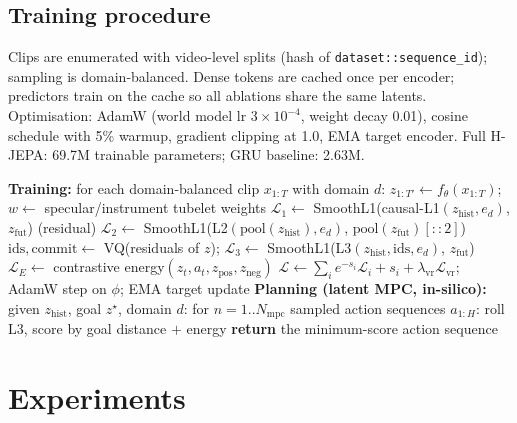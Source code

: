 \documentclass[final,3p,times,twocolumn]{elsarticle}
\begin{document}
\subsection{Training procedure}
Clips are enumerated with video-level splits (hash of \texttt{dataset::sequence\_id}); sampling is domain-balanced. Dense tokens are cached once per encoder; predictors train on the cache so all ablations share the same latents. Optimisation: AdamW (world model lr $3\times10^{-4}$, weight decay 0.01), cosine schedule with 5\% warmup, gradient clipping at 1.0, EMA target encoder. Full H-JEPA: 69.7M trainable parameters; GRU baseline: 2.63M.

\begin{algorithm}[t]
\caption{Endo-HJEPA training and planning (no pixel loss).}
\label{alg:train}
\begin{algorithmic}[1]
\STATE \textbf{Training:} for each domain-balanced clip $x_{1:T}$ with domain $d$:
\STATE \quad $z_{1:T'} \leftarrow f_\theta(x_{1:T})$; \quad $w \leftarrow$ specular/instrument tubelet weights
\STATE \quad $\mathcal{L}_1 \leftarrow$ SmoothL1(causal-L1$(z_{\mathrm{hist}},e_d)$, $z_{\mathrm{fut}}$) \quad (residual)
\STATE \quad $\mathcal{L}_2 \leftarrow$ SmoothL1(L2$(\mathrm{pool}(z_{\mathrm{hist}}),e_d)$, $\mathrm{pool}(z_{\mathrm{fut}})[::2]$)
\STATE \quad $\mathrm{ids}, \mathrm{commit} \leftarrow$ VQ(residuals of $z$); \quad $\mathcal{L}_3 \leftarrow$ SmoothL1(L3$(z_{\mathrm{hist}},\mathrm{ids},e_d)$, $z_{\mathrm{fut}}$)
\STATE \quad $\mathcal{L}_E \leftarrow$ contrastive energy$(z_t,a_t,z_{\mathrm{pos}},z_{\mathrm{neg}})$
\STATE \quad $\mathcal{L} \leftarrow \sum_i e^{-s_i}\mathcal{L}_i + s_i + \lambda_{\mathrm{vr}}\mathcal{L}_{\mathrm{vr}}$; \quad AdamW step on $\phi$; EMA target update
\STATE \textbf{Planning (latent MPC, in-silico):} given $z_{\mathrm{hist}}$, goal $z^\star$, domain $d$:
\STATE \quad for $n{=}1..N_{\mathrm{mpc}}$ sampled action sequences $a_{1:H}$: roll L3, score by goal distance $+$ energy
\STATE \quad \textbf{return} the minimum-score action sequence
\end{algorithmic}
\end{algorithm}

\section{Experiments}\label{sec:results}
\end{document}
